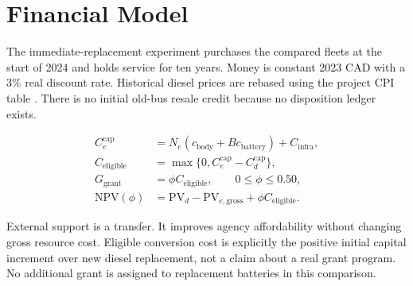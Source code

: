 
\section{Financial Model}

The immediate-replacement experiment purchases the compared fleets at the start of 2024 and holds service for ten years. Money is constant 2023 CAD with a 3\% real discount rate. Historical diesel prices are rebased using the project CPI table \cite{ref13}. There is no initial old-bus resale credit because no disposition ledger exists.


\begin{align}
C_e^{\mathrm{cap}}&=N_e(c_{\mathrm{body}}+B c_{\mathrm{battery}})+C_{\mathrm{infra}},\\
C_{\mathrm{eligible}}&=\max\{0,C_e^{\mathrm{cap}}-C_d^{\mathrm{cap}}\},\\
G_{\mathrm{grant}}&=\phi C_{\mathrm{eligible}},\qquad 0\le\phi\le0.50,\\
\mathrm{NPV}(\phi)&=\mathrm{PV}_d-\mathrm{PV}_{e,\mathrm{gross}}
                       +\phi C_{\mathrm{eligible}}.
\end{align}

External support is a transfer. It improves agency affordability without changing gross resource cost. Eligible conversion cost is explicitly the positive initial capital increment over new diesel replacement, not a claim about a real grant program. No additional grant is assigned to replacement batteries in this comparison.


